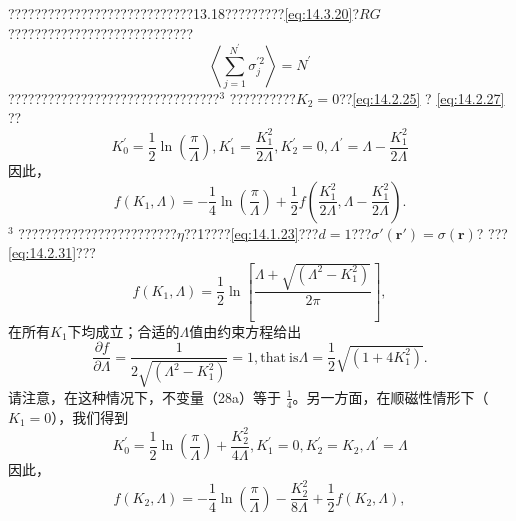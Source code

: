 ????????????????????????????13.18?????????\autoref{eq:14.3.20}?\(RG\)????????????????????????????
\begin{equation}\tag{14.2.35}\label{eq:14.2.35}
\left\langle \sum _ { j = 1 } ^{N ^ { \prime} } \sigma _ { j } ^{\prime 2} \right\rangle = N ^{\prime}
\end{equation}
????????????????????????????????\(^{3}\) ??????????\(K_{2} = 0\)??\autoref{eq:14.2.25} ? \autoref{eq:14.2.27} ??
\begin{equation}\tag{14.2.36}\label{eq:14.2.36}
K _ { 0 } ^{\prime} = \frac { 1 } { 2 } \ln \left( \frac { \pi } { \Lambda } \right) ,  K _ { 1 } ^{\prime} = \frac { K _ { 1 } ^{2} } { 2 \Lambda } ,  K _ { 2 } ^{\prime} = 0 ,  \Lambda ^{\prime} = \Lambda - \frac { K _ { 1 } ^{2} } { 2 \Lambda }
\end{equation}
因此，
\begin{equation}\tag{14.2.37}\label{eq:14.2.37}
f ( K _ { 1 } , \Lambda ) = - \frac { 1 } { 4 } \ln \left( \frac { \pi } { \Lambda } \right) + \frac { 1 } { 2 } f \left( \frac { K _ { 1 } ^{2} } { 2 \Lambda } , \Lambda - \frac { K _ { 1 } ^{2} } { 2 \Lambda } \right) .
\end{equation}
\(^{3}\) ????????????????????????\(\eta\)??1????\autoref{eq:14.1.23}???\(d=1\)???\(\sigma\prime(\boldsymbol{r}\prime)=\sigma(\boldsymbol{r})\)?
???\autoref{eq:14.2.31}???
\begin{equation}\tag{14.2.38}\label{eq:14.2.38}
f ( K _ { 1 } , \Lambda ) = \frac { 1 } { 2 } \ln \left[ \frac { \Lambda + \sqrt { ( \Lambda ^{2} - K _ { 1 } ^{2} ) } } { 2 \pi } \right] ,
\end{equation}
在所有\(K_{1}\)下均成立；合适的\(\Lambda\)值由约束方程给出
\begin{equation}\tag{14.2.39}\label{eq:14.2.39}
\frac { \partial f } { \partial \Lambda } = \frac { 1 } { 2 \sqrt { ( \Lambda ^{2} - K _ { 1 } ^{2} ) } } = 1 ,  \mathrm { t h a t ~ i s }  \Lambda = \frac { 1 } { 2 } \sqrt { ( 1 + 4 K _ { 1 } ^{2} ) } .
\end{equation}
请注意，在这种情况下，不变量（28a）等于 \(\frac{1}{4}\)。另一方面，在顺磁性情形下（\(K_{1}=0\)），我们得到
\begin{equation}\tag{14.2.40}\label{eq:14.2.40}
K _ { 0 } ^{\prime} = \frac { 1 } { 2 } \ln \left( \frac { \pi } { \Lambda } \right) + \frac { K _ { 2 } ^{2} } { 4 \Lambda } ,  K _ { 1 } ^{\prime} = 0 ,  K _ { 2 } ^{\prime} = K _ { 2 } ,  \Lambda ^{\prime} = \Lambda
\end{equation}
因此，
\begin{equation}\tag{14.2.41}\label{eq:14.2.41}
f ( K _ { 2 } , \Lambda ) = - \frac { 1 } { 4 } \ln \left( \frac { \pi } { \Lambda } \right) - \frac { K _ { 2 } ^{2} } { 8 \Lambda } + \frac { 1 } { 2 } f ( K _ { 2 } , \Lambda ) ,
\end{equation}
